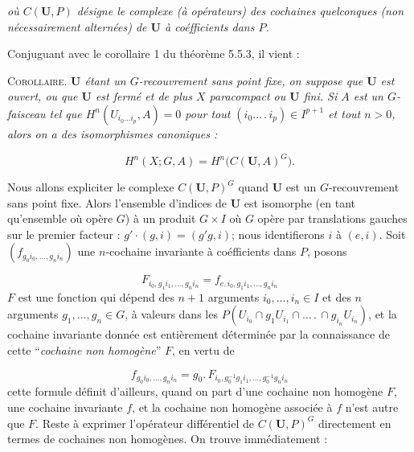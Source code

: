 \clearpage
{}

\noindent\textit{où $C({\mathbf U},P)$ désigne le complexe (à opérateurs) des
cochaines quelconques (non nécessairement alternées) de ${\mathbf U}$ à
coéfficients dans $P$.}

Conjuguant avec le corollaire 1 du théorème 5.5.3, il vient :

\textsc{Corollaire.} \textit{${\mathbf U}$ étant un $G$-recouvrement
sans point fixe, on suppose que ${\mathbf U}$ est ouvert, ou que ${\mathbf U}$
est fermé et de plus $X$ paracompact ou ${\mathbf U}$ fini. Si $A$ est un
$G$-faisceau tel que $H^n(U_{i_0\ldots i_p},A)=0$ pour tout
$(i_0\ldots\,.\,i_p)\in I^{p+1}$ et tout $n>0$, alors on a des isomorphismes
canoniques :}

\[
H^n(X;G,A)=H^n\bigl(C({\mathbf U},A)^G\bigr).
\]

Nous allons expliciter le complexe $C({\mathbf U},P)^G$ quand ${\mathbf U}$ est
un $G$-recouvrement sans point fixe. Alors l'ensemble d'indices de
${\mathbf U}$ est isomorphe (en tant qu'ensemble où opère $G$) à un produit
$G\times I$ où $G$ opère par translations gauches sur le premier facteur :
$g'\cdot(g,i)=(g'g,i)$; nous identifierons $i$ à $(e,i)$. Soit
$(f_{g_0i_0,\ldots,g_ni_n})$ une $n$-cochaine invariante à coéfficients dans
$P$, posons

\[
\tag{5.5,9}
F_{i_0,g_1i_1,\ldots,g_ni_n}
=f_{e.\,i_0,g_1i_1,\ldots,g_ni_n}
\]
$F$ est une fonction qui dépend des $n+1$ arguments $i_0,\ldots,i_n\in I$ et
des $n$ arguments $g_1,\ldots,g_n\in G$, à valeurs dans les
$P(U_{i_0}\cap g_1U_{i_1}\cap\ldots\,.\,\cap g_{i_n}U_{i_n})$, et la cochaine
invariante donnée est entièrement déterminée par la connaissance de cette
``\emph{cochaine non homogène}'' $F$, en vertu de

\[
\tag{5.5.10}
f_{g_0i_0,\ldots,g_ni_n}
=g_0.\,F_{i_0,g_0^{-1}g_1i_1,\ldots,g_0^{-1}g_ni_n}
\]
cette formule définit d'ailleurs, quand on part d'une cochaine non homogène
$F$, une cochaine invariante $f$, et la cochaine non homogène associée à $f$
n'est autre que $F$. Reste à exprimer l'opérateur différentiel de
$C({\mathbf U},P)^G$ directement en termes de cochaines non homogènes. On trouve
immédiatement :

